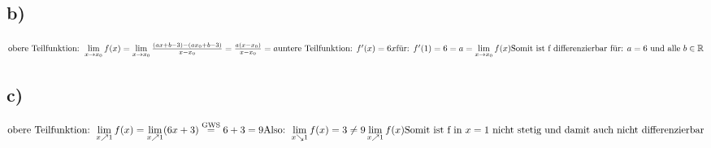 \documentclass[a4paper, 11pt]{article}
\begin{document}
\subsection{b)}
\label{sec:org8e305b1}
\begin{math}
    \text{obere Teilfunktion: }
    \newline
    \lim \limits_{x \to x_0} f(x) =
        \lim \limits_{x \to x_0} \frac{(ax + b - 3) -
            (ax_0 + b - 3)}{x - x_0} = \frac{a(x - x_0)}{x - x_0} = a
    \newline
    \newline
    \text{untere Teilfunktion: }
    \newline
    f'(x) = 6x
    \newline
    \text{für: }f'(1) = 6 = a = \lim \limits_{x \to x_0} f(x)
    \newline
    \newline
    \text{Somit ist f differenzierbar für: } a = 6 \text{ und alle } b \in \mathbb{R}
\end{math}

\subsection{c)}
\label{sec:orgaf5a11b}
\begin{math}
    \text{obere Teilfunktion: }
    \newline
    \lim \limits_{x \nearrow 1} f(x) =
        \lim \limits_{x \nearrow 1} (6x + 3) \overset{\text{GWS}}{=} 6 + 3 = 9
    \newline
    \newline
    \text{Also: }\lim \limits_{x \searrow 1} f(x) =
        3 \neq 9 \lim \limits_{x \nearrow 1} f(x)
    \newline
    \newline
    \text{Somit ist f in } x = 1
    \text{ nicht stetig und damit auch nicht differenzierbar}
\end{math}
\end{document}
